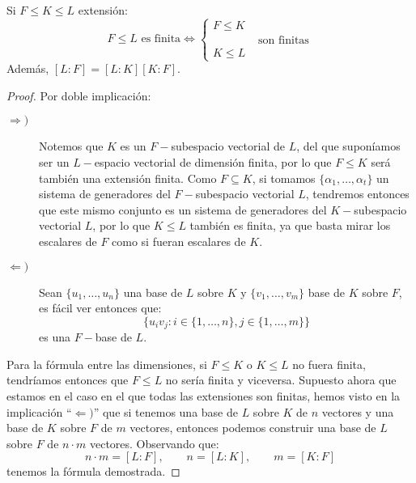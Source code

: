 \begin{lema}[de la torre]
    Si $F\leq K \leq L$ extensión:
    \begin{equation*}
        F\leq L \text{\ es finita} \Longleftrightarrow \left\{\begin{array}{l}
            F\leq K \\
            \qquad \qquad \text{son finitas} \\
            K \leq L 
        \end{array}\right.
    \end{equation*}
    Además, $[L:F] = [L:K][K:F]$.
    \begin{proof}
        Por doble implicación:
        \begin{description}
            \item [$\Longrightarrow )$] Notemos que $K$ es un $F-$subespacio vectorial de $L$, del que suponíamos ser un $L-$espacio vectorial de dimensión finita, por lo que $F\leq K$ será también una extensión finita. Como $F\subseteq K$, si tomamos $\{\alpha_1, \ldots, \alpha_t\}$ un sistema de generadores del $F-$subespacio vectorial $L$, tendremos entonces que este mismo conjunto es un sistema de generadores del $K-$subespacio vectorial $L$, por lo que $K\leq L$ también es finita, ya que basta mirar los escalares de $F$ como si fueran escalares de $K$.
            \item [$\Longleftarrow )$] Sean $\{u_1, \ldots, u_n\}$ una base de $L$ sobre $K$ y $\{v_1, \ldots, v_m\}$ base de $K$ sobre $F$, es fácil ver entonces que:
                \begin{equation*}
                    \{u_i v_j : i \in \{1,\ldots,n\}, j\in \{1,\ldots,m\}\}
                \end{equation*}
                es una $F-$base de $L$.
        \end{description}
        Para la fórmula entre las dimensiones, si $F\leq K$ o $K\leq L$ no fuera finita, tendríamos entonces que $F\leq L$ no sería finita y viceversa. Supuesto ahora que estamos en el caso en el que todas las extensiones son finitas, hemos visto en la implicación ``$\Longleftarrow )$'' que si tenemos una base de $L$ sobre $K$ de $n$ vectores y una base de $K$ sobre $F$ de $m$ vectores, entonces podemos construir una base de $L$ sobre $F$ de $n\cdot m$ vectores. Observando que:
        \begin{equation*}
            n\cdot m = [L:F], \qquad n = [L:K], \qquad m = [K:F]
        \end{equation*}
        tenemos la fórmula demostrada.
    \end{proof}
\end{lema}

